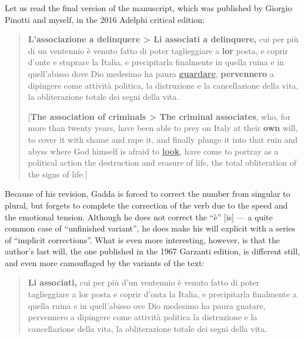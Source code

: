 \begin{paper}
Let us read the final version of the manuscript, which was published by Giorgio Pinotti and myself, in the 2016 Adelphi critical edition:

\begin{quote}
\textbf{L'associazione a delinquere \textgreater{} Li associati a
delinquere,} cui per più di un ventennio è venuto fatto di poter
taglieggiare a \textbf{lor} posta, e coprir d'onte e stuprare la Italia,
e precipitarla finalmente in quella ruina e in quell'abisso dove Dio
medesimo ha paura \textbf{\uline{guardare}}, \textbf{pervennero} a
dipingere come attività politica, la distruzione e la cancellazione
della vita, la obliterazione totale dei segni della vita.

\vspace{1em}

[\textbf{The association of criminals \textgreater{} The criminal
associates}, who, for more than twenty years, have been able to prey on
Italy at their \textbf{own} will, to cover it with shame and rape it,
and finally plunge it into that ruin and abyss where God himself is
afraid to \textbf{\uline{look}}, have come to portray as a political action the
destruction and erasure of life, the total obliteration of the signs of
life.]

\begin{flushright}
\parencite[11]{gadda_eros_2016}
\end{flushright}

\end{quote}


\noindent Because of his revision, Gadda is forced to correct the number from singular to plural, but forgets to complete the
correction of the verb due to the speed and the emotional tension. Although he does not correct the ``è'' [is] –– a quite common case
of ``unfinished variant'', he does make his will explicit with a series of ``implicit corrections''. What is even more interesting, however, is that the author's last will, the
one published in the 1967 Garzanti edition, is different still, and even more camouflaged by the variants of the text:

\begin{quote}
\textbf{Li associati,} cui per più d'un ventennio è venuto fatto di
poter taglieggiare a lor posta e coprir d'onta la Italia, e precipitarla
finalmente a quella ruina e in quell'abisso ove Dio medesimo ha paura
guatare, pervennero a dipingere come attività politica la distruzione e
la cancellazione della vita, la obliterazione totale dei segni della
vita.


\end{quote}
\end{paper}
